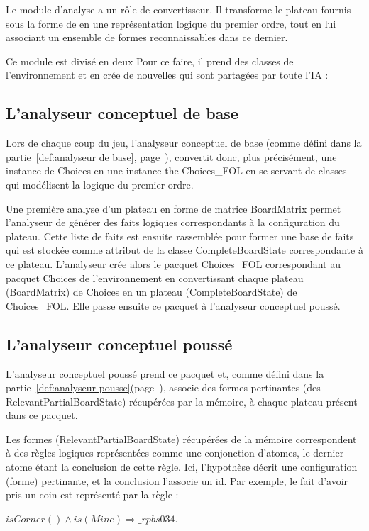 Le module d'analyse a un rôle de convertisseur. Il transforme le plateau fournis sous la forme de en une représentation logique du premier ordre, tout en lui associant un ensemble de formes reconnaissables dans ce dernier. 

Ce module est divisé en deux 
Pour ce faire, il prend des classes de l'environnement et en crée de nouvelles qui sont partagées par toute l'IA :
\subsection{L'analyseur conceptuel de base}
Lors de chaque coup du jeu, l'analyseur conceptuel de base (comme défini dans la partie~\ref{def:analyseur de base}, page~\pageref{def:analyseur de base}), convertit donc, plus précisément, une instance de Choices en une instance the Choices\_FOL en se servant de classes qui modélisent la logique du premier ordre. 

Une première analyse d'un plateau en forme de matrice BoardMatrix permet l'analyseur de générer des faits logiques correspondants à la configuration du plateau. Cette liste de faits est ensuite rassemblée pour former une base de faits qui est stockée comme attribut de la classe CompleteBoardState correspondante à ce plateau. L'analyseur crée alors le pacquet Choices\_FOL correspondant au pacquet Choices de l'environnement en convertissant chaque plateau (BoardMatrix) de Choices en un plateau (CompleteBoardState) de Choices\_FOL. Elle passe ensuite ce pacquet à l'analyseur conceptuel poussé. 
\subsection{L'analyseur conceptuel poussé}
L'analyseur conceptuel poussé prend ce pacquet et, comme défini dans la partie~\ref{def:analyseur pousse}(page~\pageref{def:analyseur pousse}), associe des formes pertinantes (des RelevantPartialBoardState) récupérées par la mémoire, à chaque plateau présent dans ce pacquet. 

Les formes (RelevantPartialBoardState) récupérées de la mémoire correspondent à des règles logiques représentées comme une conjonction d'atomes, le dernier atome étant la conclusion de cette règle. Ici, l'hypothèse décrit une configuration (forme) pertinante, et la conclusion l'associe un id. Par exemple, le fait d'avoir pris un coin est représenté par la règle :

\textit{$isCorner() \wedge is(Mine) \Longrightarrow \_rpbs034$}. 

